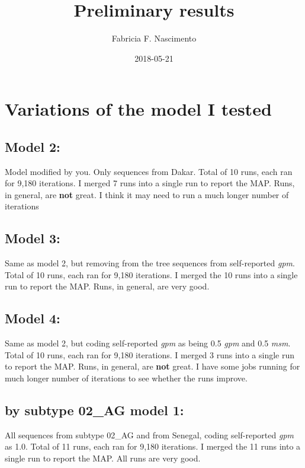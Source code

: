 \documentclass[12pt,]{article}
\title{Preliminary results}
\author{Fabricia F. Nascimento}
\date{2018-05-21}
\begin{document}
\maketitle

\hypertarget{variations-of-the-model-i-tested}{%
\section{Variations of the model I
tested}\label{variations-of-the-model-i-tested}}

\hypertarget{model-2}{%
\subsection{Model 2:}\label{model-2}}

Model modified by you. Only sequences from Dakar. Total of 10 runs, each
ran for 9,180 iterations. I merged 7 runs into a single run to report
the MAP. Runs, in general, are \textbf{not} great. I think it may need
to run a much longer number of iterations

\hypertarget{model-3}{%
\subsection{Model 3:}\label{model-3}}

Same as model 2, but removing from the tree sequences from self-reported
\emph{gpm}. Total of 10 runs, each ran for 9,180 iterations. I merged
the 10 runs into a single run to report the MAP. Runs, in general, are
very good.

\hypertarget{model-4}{%
\subsection{Model 4:}\label{model-4}}

Same as model 2, but coding self-reported \emph{gpm} as being 0.5
\emph{gpm} and 0.5 \emph{msm}. Total of 10 runs, each ran for 9,180
iterations. I merged 3 runs into a single run to report the MAP. Runs,
in general, are \textbf{not} great. I have some jobs running for much
longer number of iterations to see whether the runs improve.

\hypertarget{by-subtype-02_ag-model-1}{%
\subsection{by subtype 02\_AG model 1:}\label{by-subtype-02_ag-model-1}}

All sequences from subtype 02\_AG and from Senegal, coding self-reported
\emph{gpm} as 1.0. Total of 11 runs, each ran for 9,180 iterations. I
merged the 11 runs into a single run to report the MAP. All runs are
very good.
\end{document}
